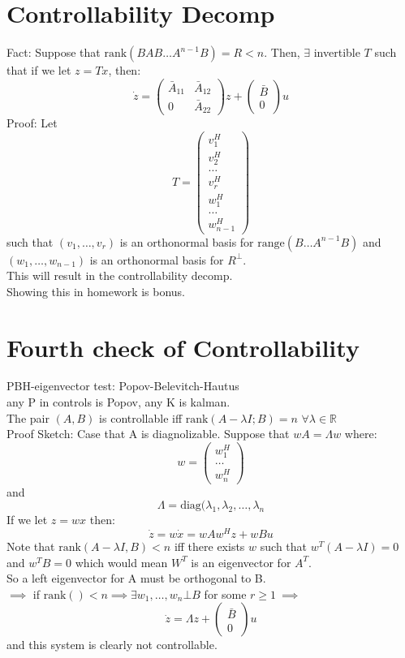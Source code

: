 \documentclass{article}
\newcommand{\rank}{\text{rank}}
\newcommand{\rng}{\text{range}}
\begin{document}
\section{Controllability Decomp}
Fact: Suppose that $\rank(B AB \dots A^{n-1}B)=R<n$. Then, $\exists$ invertible $T$ such that if we let $z=Tx$, then:\\
\[\dot{z}=\begin{pmatrix}\bar{A}_{11} & \bar{A}_{12}\\0 & \bar{A}_{22}\end{pmatrix}z+\begin{pmatrix}\bar{B}\\0\end{pmatrix}u\]
Proof: Let 
\[T=\begin{pmatrix}v_1^H\\v_2^H\\\dots\\v_r^H\\w_1^H\\\dots\\w_{n-1}^H\end{pmatrix}\]
such that $(v_1,\dots,v_r)$ is an orthonormal basis for $\rng(B\dots A^{n-1}B)$ and $(w_1,\dots,w_{n-1})$ is an orthonormal basis for $R^{\bot}$.\\
This will result in the controllability decomp.\\
Showing this in homework is bonus.\\

\section{Fourth check of Controllability}
PBH-eigenvector test: Popov-Belevitch-Hautus\\
any P in controls is Popov, any K is kalman.\\
The pair $(A,B)$ is controllable iff $\rank(A-\lambda I; B)=n$ $\forall \lambda\in\mathbb{R}$\\
Proof Sketch: Case that A is diagnolizable. Suppose that $wA=\Lambda w$ where:
\[w=\begin{pmatrix}w_1^H\\\dots\\w_n^H\end{pmatrix}\]
and\\
\[\Lambda=\text{diag}(\lambda_1,\lambda_2,\dots,\lambda_n\]
If we let $z=wx$ then:\\
\[\dot{z}=w\dot{x}=wAw^Hz+wBu\]
Note that $\rank(A-\lambda I,B)<n$ iff there exists $w$ such that $w^T(A-\lambda I)=0$ and $w^TB=0$ which would mean $W^T$ is an eigenvector for $A^T$.\\
So a left eigenvector for A must be orthogonal to B.\\
$\implies$ if $\rank()<n\implies \exists w_1,\dots,w_n \bot B$ for some $r\geq 1\ \implies$\\
\[\dot{z}=\Lambda z+\begin{pmatrix}\bar{B}\\0\end{pmatrix}u\]
and this system is clearly not controllable.\\
\end{document}

